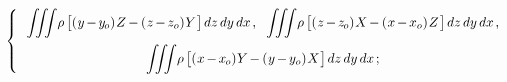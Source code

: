 \documentclass[11pt, twoside, leqno]{article}
\begin{document}
\begin{equation*}
\left\{\hspace{.4ex}\begin{array}{c}
\displaystyle\iiint \hspace{-0.4ex}
\rho \hspace{1.5pt} \bigl[ (\hspace{.1ex} y \hspace{-0.2ex}-\hspace{-0.2ex} y_{\hspace{-0.14ex}o} ) \hspace{.15ex} Z \hspace{-0.15ex} - \hspace{-0.1ex} (\hspace{.1ex} z \hspace{-0.2ex}-\hspace{-0.2ex} z_o ) \hspace{.1ex} Y \hspace{.15ex}\bigr]
\hspace{.3ex} dz \, dy \, dx
\hspace{.3ex} \text{,}
\hspace{.6em}
\displaystyle\iiint \hspace{-0.4ex}
\rho \hspace{1.5pt} \bigl[ (\hspace{.1ex} z \hspace{-0.2ex}-\hspace{-0.2ex} z_{\hspace{-0.14ex}o} ) \hspace{.15ex} X \hspace{-0.2ex} - \hspace{-0.1ex} (\hspace{.1ex} x \hspace{-0.2ex}-\hspace{-0.2ex} x_o ) \hspace{.15ex} Z \hspace{.2ex}\bigr]
\hspace{.3ex} dz \, dy \, dx
\hspace{.3ex} \text{,}
\\[1em]
\displaystyle\iiint \hspace{-0.4ex}
\rho \hspace{1.5pt} \bigl[ (\hspace{.1ex} x \hspace{-0.2ex}-\hspace{-0.2ex} x_{\hspace{-0.14ex}o} ) \hspace{.1ex} Y \hspace{-0.2ex} - \hspace{-0.1ex} (\hspace{.1ex} y \hspace{-0.2ex}-\hspace{-0.2ex} y_o ) \hspace{.15ex} X \hspace{.15ex}\bigr]
\hspace{.3ex} dz \, dy \, dx
\hspace{.3ex} \text{;}
\end{array}\right.
\vspace{.4em}\end{equation*}
\end{document}
